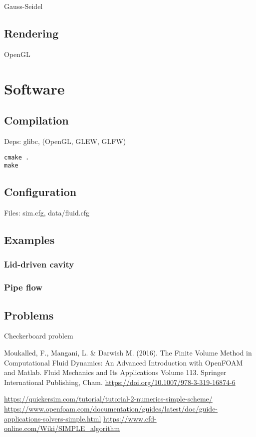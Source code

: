 \documentclass[12pt]{article}
\begin{document}
Gauss-Seidel

\subsection{Rendering}

OpenGL

\section{Software}

\subsection{Compilation}

Deps: glibc, (OpenGL, GLEW, GLFW)

\begin{verbatim}
cmake .
make
\end{verbatim}

\subsection{Configuration}

Files: sim.cfg, data/fluid.cfg

\subsection{Examples}

\subsubsection{Lid-driven cavity}

\subsubsection{Pipe flow}

\subsection{Problems}

Checkerboard problem

\begin{thebibliography}{9}
 Moukalled, F., Mangani, L. \& Darwish M. (2016). The Finite Volume Method in Computational Fluid Dynamics: An Advanced Introduction with OpenFOAM and Matlab. Fluid Mechanics and Its Applications Volume 113. Springer International Publishing, Cham. \url{https://doi.org/10.1007/978-3-319-16874-6}
  
 \url{https://quickersim.com/tutorial/tutorial-2-numerics-simple-scheme/}
 \url{https://www.openfoam.com/documentation/guides/latest/doc/guide-applications-solvers-simple.html}
 \url{https://www.cfd-online.com/Wiki/SIMPLE_algorithm}

\end{thebibliography}
\end{document}
